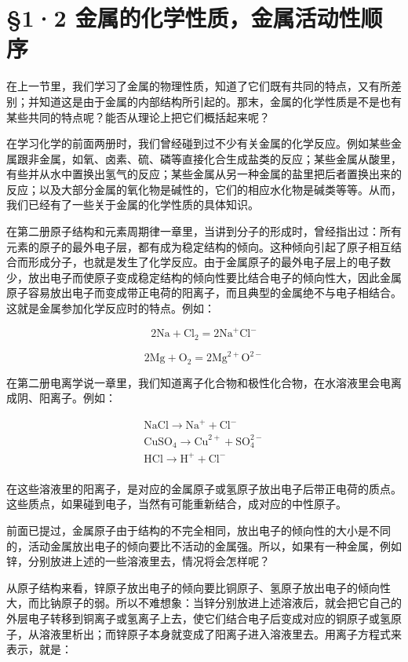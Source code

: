 \section{§1·2 金属的化学性质，金属活动性顺序}

在上一节里，我们学习了金属的物理性质，知道了它们既有共同的特点，又有所差别；并知道这是由于金属的内部结构所引起的。那末，金属的化学性质是不是也有某些共同的特点呢？能否从理论上把它们概括起来呢？

在学习化学的前面两册时，我们曾经碰到过不少有关金属的化学反应。例如某些金属跟非金属，如氧、卤素、硫、磷等直接化合生成盐类的反应；某些金属从酸里，有些并从水中置换出氢气的反应；某些金属从另一种金属的盐里把后者置换出来的反应；以及大部分金属的氧化物是碱性的，它们的相应水化物是碱类等等。从而，我们已经有了一些关于金属的化学性质的具体知识。

在第二册原子结构和元素周期律一章里，当讲到分子的形成时，曾经指出过：所有元素的原子的最外电子层，都有成为稳定结构的倾向。这种倾向引起了原子相互结合而形成分子，也就是发生了化学反应。由于金属原子的最外电子层上的电子数少，放出电子而使原子变成稳定结构的倾向性要比结合电子的倾向性大，因此金属原子容易放出电子而变成带正电荷的阳离子，而且典型的金属绝不与电子相结合。这就是金属参加化学反应时的特点。例如：

\[
2 \mathrm{Na} + \mathrm{Cl} _ {2} = 2 \mathrm{Na} ^ {+} \mathrm{Cl} ^ {-}
\]

\[
2 \mathrm{Mg} + \mathrm{O} _ {2} = 2 \mathrm{Mg} ^{2+} \mathrm{O} ^{2-}
\]

在第二册电离学说一章里，我们知道离子化合物和极性化合物，在水溶液里会电离成阴、阳离子。例如：

\[
\begin{array}{l} \mathrm{NaCl} \xrightarrow {\quad} \mathrm{Na} ^ {+} + \mathrm{Cl} ^ {-} \\ \mathrm{CuSO} _ {4} \xrightarrow {\quad} \mathrm{Cu} ^{2+} + \mathrm{SO} _ {4}^{2-} \\ \mathrm{HCl} \xrightarrow {\quad} \mathrm{H} ^ {+} + \mathrm{Cl} ^ {-} \\ \end{array}
\]

在这些溶液里的阳离子，是对应的金属原子或氢原子放出电子后带正电荷的质点。这些质点，如果碰到电子，当然有可能重新结合，成对应的中性原子。

前面已提过，金属原子由于结构的不完全相同，放出电子的倾向性的大小是不同的，活动金属放出电子的倾向要比不活动的金属强。所以，如果有一种金属，例如锌，分别放进上述的一些溶液里去，情况将会怎样呢？

从原子结构来看，锌原子放出电子的倾向要比铜原子、氢原子放出电子的倾向性大，而比钠原子的弱。所以不难想象：当锌分别放进上述溶液后，就会把它自己的外层电子转移到铜离子或氢离子上去，使它们结合电子后变成对应的铜原子或氢原子，从溶液里析出；而锌原子本身就变成了阳离子进入溶液里去。用离子方程式来表示，就是：

